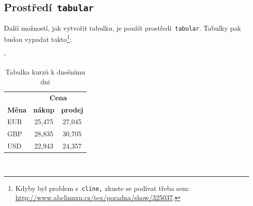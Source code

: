 \documentclass[11pt]{article}
\begin{document}
\subsection{Prostředí\texttt{ tabular}}
Další možností, jak vytvořit tabulku, je použít prostředí\texttt{ tabular}. Tabulky pak budou vypadat takto\footnote{Kdyby byl problem s\texttt{ cline,} zkuste se podívat třeba sem: \url{http://www.abclinuxu.cz/tex/poradna/show/325037}.}:
\\\setlength\arrayrulewidth{0.5pt}
\begin{table}[hb]
    \catcode`
    \centering
    \begin{tabular}{|l|c|c|}
        \hline
         & \multicolumn{2}{c|}{\textbf{Cena}} \\\cline{2-3}
        \textbf{Měna} & \textbf{nákup}  & \textbf{prodej} \\\hline
        EUR  & 25,475 & 27,045 \\
        GBP  & 28,835 & 30,705 \\
        USD  & 22,943 & 24,357 \\\hline
    \end{tabular}
    \caption{Tabulka kurzů k dnešnímu dni}
    \label{tab:kurzy_men}
\end{table}
\\
\end{document}
